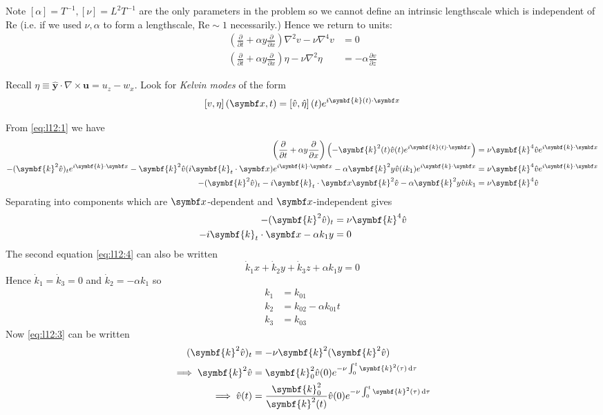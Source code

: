 \documentclass{jknotes}
\renewcommand{\u}{\symbf{u}}
\newcommand{\ReN}{\text{Re}}
\renewcommand{\k}{\symbf{k}}
\begin{document}
Note $\left[\alpha\right] = T^{-1}, \left[\nu\right] = L^2 T^{-1}$ are the
only parameters in the problem so we
cannot define an intrinsic lengthscale which is independent of $\ReN$ (i.e. if
we used $\nu, \alpha$ to form a lengthscale, $\ReN \sim 1$ necessarily.)
Hence we return to units:
\begin{align}
	\left(\frac{\partial}{\partial t} + \alpha y \frac{\partial}{\partial x}\right)
	\nabla^2 v -\nu \nabla^4 v &= 0 \label{eq:l12:1}\\
	\left(\frac{\partial}{\partial t} + \alpha y \frac{\partial}{\partial x}\right)
	\eta - \nu \nabla^2 \eta &= -\alpha \frac{\partial v}{\partial z}
	\label{eq:l12:2}
\end{align}

Recall $\eta \equiv \hat{\symbf{y}}\cdot\nabla \times \u = u_z - w_x$. Look
for \emph{Kelvin modes} of the form
\begin{equation}
	\left[v,\eta\right](\x,t) =
	\left[\hat{v},\hat{\eta}\right](t)e^{i\symbf{k}(t)\cdot\x}
\end{equation}

From \eqref{eq:l12:1} we have
\begin{align}
	\left(\frac{\partial}{\partial t} + \alpha y \frac{\partial}{\partial
	x}\right) \left(-\k^2(t)\hat{v}(t)e^{i\k(t)\cdot\x}\right) 
	&= \nu \k^4 \hat{v}e^{i\k\cdot\x} \\
	-(\k^2 \hat{v})_t e^{i\k\cdot\x} - \k^2
	\hat{v}(i\k_t\cdot\x)e^{i\k\cdot\x} - \alpha \k^2 y
	\hat{v}(ik_1)e^{i\k\cdot\x} &= \nu \k^4 \hat{v}e^{i\k\cdot\x} \\
	-(\k^2\hat{v})_t - i\k_t\cdot\x\k^2\hat{v} - \alpha \k^2 y \hat{v}ik_1
								&= \nu \k^4 \hat{v}
\end{align}
Separating into components which are $\x$-dependent and $\x$-independent gives
\begin{align}
	-(\k^2\hat{v})_t &= \nu \k^4 \hat{v} \label{eq:l12:3}\\
	-i\k_t\cdot\x - \alpha k_1 y &= 0 \label{eq:l12:4}
\end{align}
The second equation \eqref{eq:l12:4} can also be written
\begin{equation}
	\dot{k}_1 x + \dot{k}_2 y + \dot{k}_3 z + \alpha k_1 y = 0
\end{equation}
Hence $\dot{k}_1 = \dot{k}_3 = 0$ and $\dot{k}_2 = -\alpha k_1$ so
\begin{align}
	k_1 &= k_{01} \\
	k_2 &= k_{02} - \alpha k_{01} t \\
	k_3 &= k_{03}
\end{align}
Now \eqref{eq:l12:3} can be written
\begin{align}
	(\k^2 \hat{v})_t &= -\nu \k^2 (\k^2 \hat{v}) \\
	\implies \k^2 \hat{v} &= \k_0^2 \hat{v}(0) e^{-\nu \int_0^t
	\k^2(\tau)\,\diffd \tau} \\
		\implies \hat{v}(t) &= \frac{\k_0^2}{\k^2(t)} \hat{v}(0) e^{-\nu \int_0^t
	\k^2(\tau)\,\diffd \tau} 
\end{align}
\end{document}

